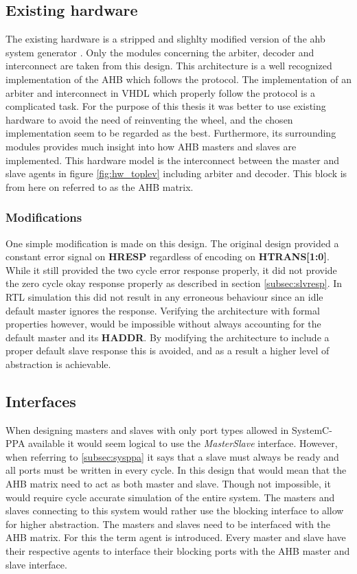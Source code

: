 \subsection{Existing hardware}
\label{sec:exist}
The existing hardware is a stripped and slighlty modified version of the ahb system generator \cite{ahbsys}. Only the modules concerning the arbiter, decoder and interconnect are taken from this design. This architecture is a well recognized implementation of the AHB which follows the protocol. The implementation of an arbiter and interconnect in VHDL which properly follow the protocol is a complicated task. For the purpose of this thesis it was better to use existing hardware to avoid the need of reinventing the wheel, and the chosen implementation seem to be regarded as the best. Furthermore, its surrounding modules provides much insight into how AHB masters and slaves are implemented. This hardware model is the interconnect between the master and slave agents in figure \ref{fig:hw_toplev} including arbiter and decoder. This block is from here on referred to as the AHB matrix.

\subsubsection{Modifications}
One simple modification is made on this design. The original design provided a constant error signal on \textbf{HRESP} regardless of encoding on \textbf{HTRANS[1:0]}. While it still provided the two cycle error response properly, it did not provide the zero cycle okay response properly as described in section \ref{subsec:slvresp}. In RTL simulation this did not result in any erroneous behaviour since an idle default master ignores the response. Verifying the architecture with formal properties however, would be impossible without always accounting for the default master and its \textbf{HADDR}. By modifying the architecture to include a proper default slave response this is avoided, and as a result a higher level of abstraction is achievable.  

\subsection{Interfaces}
\label{sec:intfc}
When designing masters and slaves with only port types allowed in SystemC-PPA available it would seem logical to use the \textit{MasterSlave} interface. However, when referring to \ref{subsec:sysppa} it says that a slave must always be ready and all ports must be written in every cycle. In this design that would mean that the AHB matrix need to act as both master and slave. Though not impossible, it would require cycle accurate simulation of the entire system. The masters and slaves connecting to this system would rather use the blocking interface to allow for higher abstraction. The masters and slaves need to be interfaced with the AHB matrix. For this the term agent is introduced. Every master and slave have their respective agents to interface their blocking ports with the AHB master and slave interface. 


